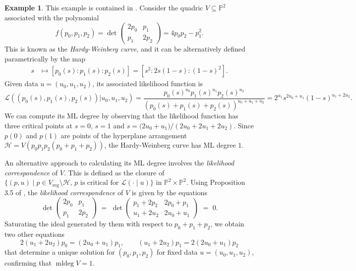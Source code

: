 \documentclass[12pt,reqno]{amsart}   	%
\theoremstyle{plain}
\theoremstyle{definition}
\newtheorem{example}[theorem]{Example}
\theoremstyle{remark}
\newcommand{\LL}{\mathcal{L}}
\newcommand{\mldeg}{\operatorname{mldeg}}
\begin{document}
\begin{example}
This example is contained in \cite{huhsturmfels2014}.
Consider the quadric $V \subseteq \mathbb{P}^2$ associated with the polynomial
    \[
        f(p_0,p_1,p_2) = \det\begin{pmatrix}
            2p_0 & p_1\\
            p_1 & 2p_2
        \end{pmatrix} = 4p_0p_2-p_1^2.
    \]
    This is known as the \textit{Hardy-Weinberg curve}, and it can be alternatively defined parametrically by the map
    \begin{align*}
    s & \mapsto [p_0(s):p_1(s):p_2(s)] = [s^2: 2s(1-s): (1-s)^2].    
    \end{align*}
    Given data $u=(u_0,u_1,u_2)$, its associated likelihood function is
    \[
    \LL((p_0(s),p_1(s),p_2(s))|{u_0,u_1,u_2}) =  \frac{p_0(s)^{u_0} p_1(s)^{u_1} p_2(s)^{u_2}}{(p_0(s)+p_1(s)+p_2(s))^{u_0+u_1+u_2}} =
2^{u_1} s^{2u_0+u_1} (1-s)^{u_1+2u_2}.
    \]
    We can compute its ML degree by observing that the likelihood function has three critical points at $s=0,\, s=1$ and $s={(2u_0+u_1})/({2u_0+2u_1+2u_2})$. Since $p(0)$ and $p(1)$ are points of the hyperplane arrangement $\mathcal{H}=V(p_0p_1p_2(p_0+p_1+p_2))$, the Hardy-Weinberg curve has ML degree $1$.
    
    An alternative approach to calculating its ML degree involves the \textit{likelihood correspondence} of $V$. This is defined as the closure of $\{(p,u) \mid p \in V_{\mathrm{reg}} \setminus \mathcal{H},\,  p \text{ is critical for }\mathcal{L}(\cdot\mid u) \}$ in $\mathbb{P}^2 \times \mathbb{P}^2$. Using Proposition 3.5 of \cite{huhsturmfels2014}, the \textit{likelihood correspondence} of $V$ is given by the equations
    \begin{equation*}
\label{eq:detdet0}
{\det}
\begin{pmatrix}
2 p_0 & p_1 \\
p_1 & 2 p_2 
\end{pmatrix} \,\, = \,\,
{\det}
\begin{pmatrix}
p_1 + 2 p_2 &  2 p_0 + p_1 \\
 u_1 + 2 u_2 
 & 2 u_0 + u_1 
\end{pmatrix} 
\,\, = \,\, 0.
\end{equation*}
Saturating the ideal generated by them with respect to $p_0 + p_1 + p_2$, we obtain two other equations
\[
2 (u_1+2u_2)p_0 =  (2u_0+u_1)p_1, \qquad
  (u_1+2u_2)p_1 =	2 (2u_0+u_1)p_2 
\]
that determine a unique solution for $(p_0,p_1,p_2)$ for fixed data $u=(u_0,u_1,u_2)$, confirming that $\mldeg V = 1$.  
\end{example}
\end{document}
